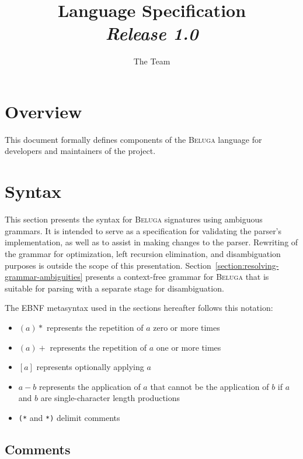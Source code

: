 \documentclass[11pt]{article}
\title{%
\Beluga Language Specification%
\\\Large\textit{Release 1.0}
}
\author{The \Beluga Team}
\newcommand{\Beluga}{\textsc{Beluga}\xspace}
\begin{document}
\maketitle

\tableofcontents

\section*{Overview}

This document formally defines components of the \Beluga language for developers and maintainers of the project.

\section{Syntax}\label{section:syntax}

This section presents the syntax for \Beluga signatures using ambiguous grammars.
It is intended to serve as a specification for validating the parser's implementation, as well as to assist in making changes to the parser.
Rewriting of the grammar for optimization, left recursion elimination, and disambiguation purposes is outside the scope of this presentation.
Section~\ref{section:resolving-grammar-ambiguities} presents a context-free grammar for \Beluga that is suitable for parsing with a separate stage for disambiguation.

The EBNF metasyntax used in the sections hereafter follows this notation:

\begin{itemize}
\item $ (a)* $ represents the repetition of $ a $ zero or more times
\item $ (a)+ $ represents the repetition of $ a $ one or more times
\item $ [a] $ represents optionally applying $ a $
\item $ a - b $ represents the application of $ a $ that cannot be the application of $ b $ if $ a $ and $ b $ are single-character length productions
\item \texttt{(*} and \texttt{*)} delimit comments
\end{itemize}

\subsection{Comments}
\end{document}

